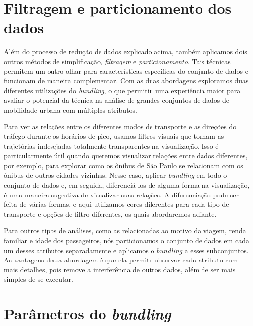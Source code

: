 \section{Filtragem e particionamento dos dados}

Além do processo de redução de dados explicado acima, também aplicamos dois
outros métodos de simplificação, \emph{filtragem} e \emph{particionamento}. Tais
técnicas permitem um outro olhar para características específicas do conjunto de
dados e funcionam de maneira complementar. Com as duas abordagens
exploramos duas diferentes utilizações do \emph{bundling}, o que permitiu uma
experiência maior para avaliar o potencial da técnica na análise
de grandes conjuntos de dados de mobilidade urbana com múltiplos atributos.

Para ver as relações entre os diferentes modos de transporte e as direções do
tráfego durante os horários de pico, usamos filtros visuais que tornam as
trajetórias indesejadas totalmente transparentes na visualização. Isso é
particularmente útil quando queremos visualizar relações entre dados diferentes,
por exemplo, para explorar como os ônibus de São Paulo se relacionam com os
ônibus de outras cidades vizinhas. Nesse caso, aplicar \emph{bundling} em todo o
conjunto de dados e, em seguida, diferenciá-los de alguma forma na visualização,
é uma maneira sugestiva de visualizar suas relações. A diferenciação pode ser
feita de várias formas, e aqui utilizamos cores diferentes para cada tipo de
transporte e opções de filtro diferentes, os quais abordaremos adiante.

Para outros tipos de análises, como as relacionadas ao motivo da viagem, renda
familiar e idade dos passageiros, nós particionamos o conjunto de dados em cada
um desses atributos separadamente e aplicamos o \emph{bundling} a esses
subconjuntos. As vantagens dessa abordagem é que ela permite observar cada
atributo com mais detalhes, pois remove a interferência de outros dados, além de
ser mais simples de se executar.

\section{Parâmetros do \emph{bundling}}

